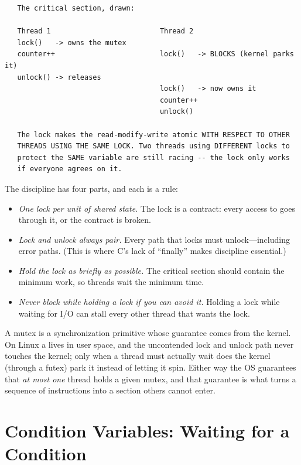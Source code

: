 \begin{verbatim}
   The critical section, drawn:

   Thread 1                          Thread 2
   lock()   -> owns the mutex
   counter++                         lock()   -> BLOCKS (kernel parks it)
   unlock() -> releases
                                     lock()   -> now owns it
                                     counter++
                                     unlock()

   The lock makes the read-modify-write atomic WITH RESPECT TO OTHER
   THREADS USING THE SAME LOCK. Two threads using DIFFERENT locks to
   protect the SAME variable are still racing -- the lock only works
   if everyone agrees on it.
\end{verbatim}

The discipline has four parts, and each is a rule:

\begin{itemize}
  \item \emph{One lock per unit of shared state.} The lock is a
    contract: every access to  goes through it, or the
    contract is broken.
  \item \emph{Lock and unlock always pair.} Every path that locks must
    unlock---including error paths. (This is where C's lack of
    ``finally'' makes discipline essential.)
  \item \emph{Hold the lock as briefly as possible.} The critical
    section should contain the minimum work, so threads wait the
    minimum time.
  \item \emph{Never block while holding a lock if you can avoid it.}
    Holding a lock while waiting for I/O can stall every other thread
    that wants the lock.
\end{itemize}

\begin{osconcept}
A mutex is a synchronization primitive whose guarantee comes from the
kernel. On Linux a  lives in user space, and
the uncontended lock and unlock path never touches the kernel; only
when a thread must actually wait does the kernel (through a futex) park
it instead of letting it spin. Either way the OS guarantees that
\emph{at most one} thread holds a given mutex, and that guarantee is
what turns a sequence of instructions into a section others cannot
enter.
\end{osconcept}

\section{Condition Variables: Waiting for a Condition}

